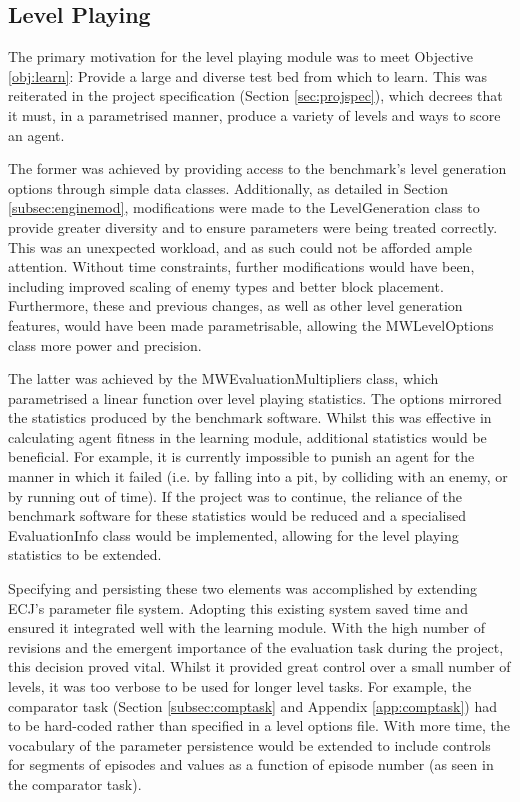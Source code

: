 
\subsection{Level Playing}

The primary motivation for the level playing module was to meet Objective \ref{obj:learn}: Provide a large and diverse test bed from which to learn. This was reiterated in the project specification (Section \ref{sec:projspec}), which decrees that it must, in a parametrised manner, produce a variety of levels and ways to score an agent.

The former was achieved by providing access to the benchmark's level generation options through simple data classes. Additionally, as detailed in Section \ref{subsec:enginemod}, modifications were made to the LevelGeneration class to provide greater diversity and to ensure parameters were being treated correctly. This was an unexpected workload, and as such could not be afforded ample attention. Without time constraints, further modifications would have been, including improved scaling of enemy types and better block placement. Furthermore, these and previous changes, as well as other level generation features, would have been made parametrisable, allowing the MWLevelOptions class more power and precision.

The latter was achieved by the MWEvaluationMultipliers class, which parametrised a linear function over level playing statistics. The options mirrored the statistics produced by the benchmark software. Whilst this was effective in calculating agent fitness in the learning module, additional statistics would be beneficial. For example, it is currently impossible to punish an agent for the manner in which it failed (i.e. by falling into a pit, by colliding with an enemy, or by running out of time). If the project was to continue, the reliance of the benchmark software for these statistics would be reduced and a specialised EvaluationInfo class would be implemented, allowing for the level playing statistics to be extended.

Specifying and persisting these two elements was accomplished by extending ECJ's parameter file system. Adopting this existing system saved time and ensured it integrated well with the learning module. With the high number of revisions and the emergent importance of the evaluation task during the project, this decision proved vital. Whilst it provided great control over a small number of levels, it was too verbose to be used for longer level tasks. For example, the comparator task (Section \ref{subsec:comptask} and Appendix \ref{app:comptask}) had to be hard-coded rather than specified in a level options file. With more time, the vocabulary of the parameter persistence would be extended to include controls for segments of episodes and values as a function of episode number (as seen in the comparator task).


